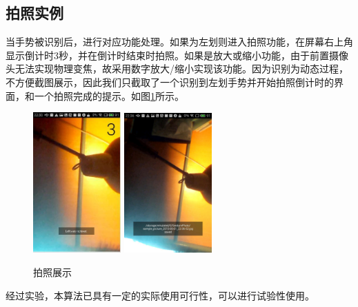 \documentclass{XDBAthesis}
\begin{document}
\subsection{拍照实例}
当手势被识别后，进行对应功能处理。如果为左划则进入拍照功能，在屏幕右上角显示倒计时3秒，并在倒计时结束时拍照。如果是放大或缩小功能，由于前置摄像头无法实现物理变焦，故采用数字放大/缩小实现该功能。因为识别为动态过程，不方便截图展示，因此我们只截取了一个识别到左划手势并开始拍照倒计时的界面，和一个拍照完成的提示。如图\ref{fg:3}所示。
\begin{figure}[htb]
    \centering
    \includegraphics[width=0.3\textwidth ]{figure/recognize}%
    \includegraphics[width=0.3\textwidth ]{figure/capture}
    \caption{拍照展示}
    \label{fg:3}
\end{figure}

经过实验，本算法已具有一定的实际使用可行性，可以进行试验性使用。

\ifx\allfiles\undefined
%

\end{document}
